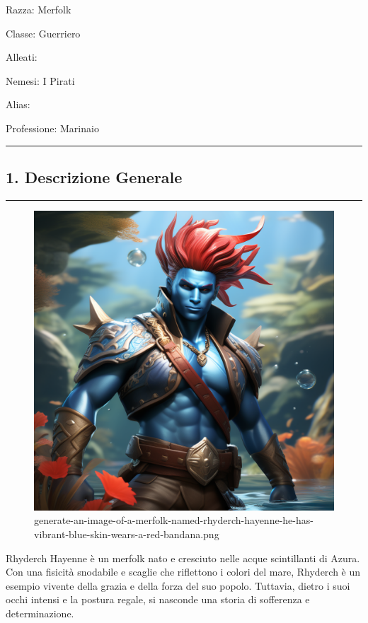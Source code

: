Razza: Merfolk

Classe: Guerriero

Alleati:

Nemesi: I Pirati

Alias:

Professione: Marinaio

\begin{center}\rule{0.5\linewidth}{0.5pt}\end{center}

\subsection{1. Descrizione Generale}\label{descrizione-generale}

\begin{center}\rule{0.5\linewidth}{0.5pt}\end{center}

\begin{figure}
\centering
\includegraphics{generate-an-image-of-a-merfolk-named-rhyderch-hayenne-he-has-vibrant-blue-skin-wears-a-red-bandana.png}
\caption{generate-an-image-of-a-merfolk-named-rhyderch-hayenne-he-has-vibrant-blue-skin-wears-a-red-bandana.png}
\end{figure}

Rhyderch Hayenne è un merfolk nato e cresciuto nelle acque scintillanti
di Azura. Con una fisicità snodabile e scaglie che riflettono i colori
del mare, Rhyderch è un esempio vivente della grazia e della forza del
suo popolo. Tuttavia, dietro i suoi occhi intensi e la postura regale,
si nasconde una storia di sofferenza e determinazione.

